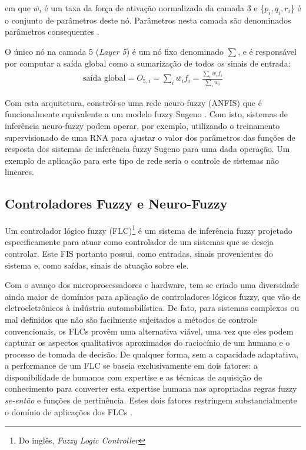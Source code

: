 em que $\bar{w_i}$ é um taxa da força de ativação normalizada da camada 3 e \{$p_i, q_i, r_i$\} é o conjunto de parâmetros deste nó. Parâmetros nesta camada são denominados parâmetros consequentes \cite[p.~336]{Jang1997}.

O único nó na camada 5 (\textit{Layer 5}) é um nó fixo denominado $\sum$, e é responsável por computar a saída global como a sumarização de todos os sinais de entrada:
\begin{align*}
    \mbox{saída global} = O_{5,i} = \sum_{i} {\bar{w_i}f_i} = \frac{\sum_{i} {w_if_i}}{\sum_{i} {w_i}} %
\end{align*}

Com esta arquitetura, constrói-se uma rede neuro-fuzzy (ANFIS) que é funcionalmente equivalente a um modelo fuzzy Sugeno \cite{Jang1997}. Com isto, sistemas de inferência neuro-fuzzy podem operar, por exemplo, utilizando o treinamento supervisionado de uma RNA para ajustar o valor dos parâmetros das funções de resposta dos sistemas de inferência fuzzy Sugeno para uma dada operação. Um exemplo de aplicação para este tipo de rede seria o controle de sistemas não lineares.

\subsection{Controladores Fuzzy e Neuro-Fuzzy}

Um controlador lógico fuzzy (FLC)\footnote{Do inglês, \textit{Fuzzy Logic Controller}} é um sistema de inferência fuzzy projetado especificamente para atuar como controlador de um sistemas que se deseja controlar. Este FIS portanto possui, como entradas, sinais provenientes do sistema e, como saídas, sinais de atuação sobre ele.

Com o avanço dos microprocessadores e hardware, tem se criado uma diversidade ainda maior de domínios para aplicação de controladores lógicos fuzzy, que vão de eletroeletrônicos à indústria automobilística. De fato, para sistemas complexos ou mal definidos que não são facilmente sujeitados a métodos de controle convencionais, os FLCs provêm uma alternativa viável, uma vez que eles podem capturar os aspectos qualitativos aproximados do raciocínio de um humano e o processo de tomada de decisão. De qualquer forma, sem a capacidade adaptativa, a performance de um FLC se baseia exclusivamente em dois fatores: a disponibilidade de humanos com expertise e as técnicas de aquisição de conhecimento para converter esta expertise humana nas apropriadas regras fuzzy \textit{se-então} e funções de pertinência. Estes dois fatores restringem substancialmente o domínio de aplicações dos FLCs \cite[p.~451]{Jang1997}.

